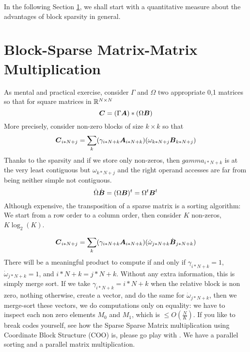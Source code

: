 \documentclass[conference]{IEEEtran}
\begin{document}
In the following Section \ref{sec:motivation}, we shall start with a
quantitative measure about the advantages of block sparsity in
general.

\section{Block-Sparse Matrix-Matrix Multiplication}
\label{sec:motivation}

 As mental and practical exercise, consider $\Gamma$ and
$\Omega$ two appropriate 0,1 matrices so that for square matrices in
$\mathbb{R}^{N\times N}$
\begin{equation}
  {\boldsymbol C} = (\Gamma {\boldsymbol A}) * (\Omega {\boldsymbol B})
\end{equation}
More precisely, consider non-zero blocks of size $k\times k$ so that
\begin{equation}
  {\boldsymbol C}_{i*N+j} = \sum_k ( \gamma_{i*N+k} {\boldsymbol A}_{i*N+k} ) (\omega_{k*N+j} {\boldsymbol B}_{k*N+j})
\end{equation}
Thanks to the sparsity and if we store only non-zeros, then
$gamma_{i*N+k}$ is at the very least contiguous but $\omega_{k*N+j}$
and the right operand accesses are far from being neither simple not
contiguous.
\begin{equation}
  \dot{\Omega}\dot{{\boldsymbol B}} = (\Omega {\boldsymbol B})^t =\Omega^t {\boldsymbol B}^t 
\end{equation}
Although expensive, the transposition of a sparse matrix is a sorting
algorithm: We start from a row order to a column order, then consider
$K$ non-zeros, $K\log_2(K)$. 

\begin{equation}
  {\boldsymbol C}_{i*N+j} = \sum_k ( \gamma_{i*N+k} {\boldsymbol A}_{i*N+k} ) (\dot{\omega}_{j*N+k} \dot{{\boldsymbol B}}_{j*N+k})
\end{equation}
There will be a meaningful product to compute if and only if
$\gamma_{i*N+k} =1$, $\dot{\omega}_{j*N+k} =1$, and
$i*N+k=j*N+k$. Without any extra information, this is simply merge
sort. If we take $\gamma_{i*N+k} = i*N+k$ when the relative block is
non zero, nothing otherwise, create a vector, and do the same for
$\dot{\omega}_{j*N+k}$, then we merge-sort these vectors, we do
computations only on equality: we have to inspect each non zero
elements $M_0$ and $M_1$, which is $\leq O(\frac{N}{K})$. If you like
to break codes yourself, see how the Sparse Sparse Matrix
multiplication using Coordinate Block Structure (COO) is, please go
play with \cite{PaoloG2020}. We have a parallel sorting and a parallel
matrix multiplication.
\end{document}
